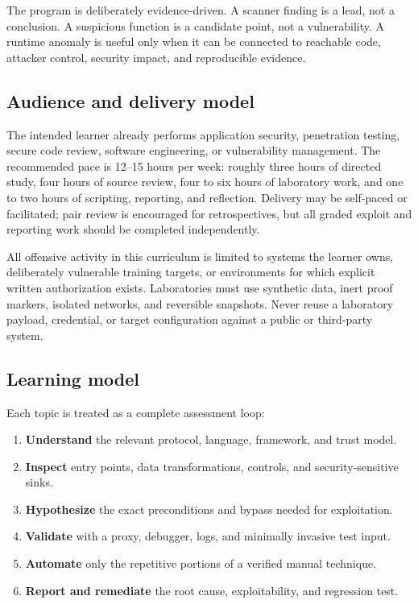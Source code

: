 \documentclass[11pt]{article}
\begin{document}
The program is deliberately evidence-driven. A scanner finding is a lead, not a
conclusion. A suspicious function is a candidate point, not a vulnerability. A
runtime anomaly is useful only when it can be connected to reachable code,
attacker control, security impact, and reproducible evidence.

\subsection{Audience and delivery model}
The intended learner already performs application security, penetration testing,
secure code review, software engineering, or vulnerability management. The
recommended pace is 12--15 hours per week: roughly three hours of directed study,
four hours of source review, four to six hours of laboratory work, and one to two
hours of scripting, reporting, and reflection. Delivery may be self-paced or
facilitated; pair review is encouraged for retrospectives, but all graded exploit
and reporting work should be completed independently.

\begin{warningbox}
All offensive activity in this curriculum is limited to systems the learner owns,
deliberately vulnerable training targets, or environments for which explicit
written authorization exists. Laboratories must use synthetic data, inert proof
markers, isolated networks, and reversible snapshots. Never reuse a laboratory
payload, credential, or target configuration against a public or third-party
system.
\end{warningbox}

\subsection{Learning model}
Each topic is treated as a complete assessment loop:
\begin{enumerate}
  \item \textbf{Understand} the relevant protocol, language, framework, and trust model.
  \item \textbf{Inspect} entry points, data transformations, controls, and security-sensitive sinks.
  \item \textbf{Hypothesize} the exact preconditions and bypass needed for exploitation.
  \item \textbf{Validate} with a proxy, debugger, logs, and minimally invasive test input.
  \item \textbf{Automate} only the repetitive portions of a verified manual technique.
  \item \textbf{Report and remediate} the root cause, exploitability, and regression test.
\end{enumerate}
\end{document}
